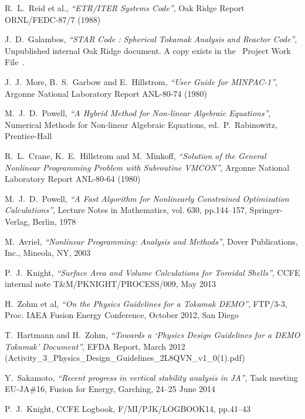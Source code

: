 \begin{thebibliography}{99}
\raggedright

R.\ L.\ Reid et al.,
\textit{``ETR/ITER Systems Code''},
Oak Ridge Report ORNL/FEDC-87/7
(1988)

J.\ D.\ Galambos,
\textit{``STAR Code : Spherical Tokamak Analysis and Reactor Code''},
Unpublished internal Oak Ridge document. A copy exists in the \process\
Project Work File~\cite{PWF}.

J.\ J.\ More, B.\ S.\ Garbow and E.\ Hillstrom,
\textit{``User Guide for MINPAC-1''},
Argonne National Laboratory Report ANL-80-74
(1980)

M.\ J.\ D.\ Powell,
\textit{``A Hybrid Method for Non-linear Algebraic Equations''},
Numerical Methods for Non-linear Algebraic Equations, ed.\ P.\ Rabinowitz,
Prentice-Hall

R.\ L.\ Crane, K.\ E.\ Hillstrom and M.\ Minkoff,
\textit{``Solution of the General Nonlinear Programming Problem with
Subroutine VMCON''},
Argonne National Laboratory Report ANL-80-64
(1980)

M.\ J.\ D.\ Powell,
\textit{``A Fast Algorithm for Nonlinearly Constrained Optimization Calculations''},
Lecture Notes in Mathematics, vol. 630, pp.144--157, Springer-Verlag, Berlin, 1978

M.\ Avriel,
\textit{``Nonlinear Programming: Analysis and Methods''},
Dover Publications, Inc., Mineola, NY, 2003

P.\ J.\ Knight,
\textit{``Surface Area and Volume Calculations for Toroidal Shells''},
CCFE internal note T\&M/PKNIGHT/PROCESS/009, May 2013

H.\ Zohm et al,
\textit{``On the Physics Guidelines for a Tokamak DEMO''},
FTP/3-3, Proc. IAEA Fusion Energy Conference, October 2012, San Diego

T.\ Hartmann and H.\ Zohm,
\textit{``Towards a `Physics Design Guidelines for a DEMO Tokamak'
  Document''},
EFDA Report, March 2012 (Activity\_3\_Physics\_Design\_Guidelines\_2L8QVN\_v1\_0(1).pdf)

Y.\ Sakamoto,
\textit{``Recent progress in vertical stability analysis in JA''},
Task meeting EU-JA\#16, Fusion for Energy, Garching, 24--25 June 2014

P.\ J.\ Knight, CCFE Logbook, F/MI/PJK/LOGBOOK14, pp.41--43


\end{thebibliography}
